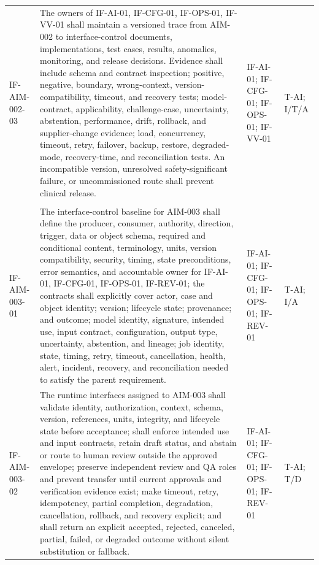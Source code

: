 \documentclass[11pt,letterpaper]{article}
\begin{document}
\begin{scriptsize}
\begin{longtable}{@{}L{0.14\textwidth}L{0.49\textwidth}L{0.19\textwidth}L{0.10\textwidth}@{}}
\addlinespace[2pt]
\mbox{IF-AIM-002-03} & The owners of IF-AI-01, IF-CFG-01, IF-OPS-01, IF-VV-01 shall maintain a versioned trace from AIM-002 to interface-control documents, implementations, test cases, results, anomalies, monitoring, and release decisions. Evidence shall include schema and contract inspection; positive, negative, boundary, wrong-context, version-compatibility, timeout, and recovery tests; model-contract, applicability, challenge-case, uncertainty, abstention, performance, drift, rollback, and supplier-change evidence; load, concurrency, timeout, retry, failover, backup, restore, degraded-mode, recovery-time, and reconciliation tests. An incompatible version, unresolved safety-significant failure, or uncommissioned route shall prevent clinical release. & IF-AI-01; IF-CFG-01; IF-OPS-01; IF-VV-01 & T-AI; I\slash\allowbreak{}T\slash\allowbreak{}A \\
\addlinespace[2pt]
 \\
\addlinespace[2pt]
\mbox{IF-AIM-003-01} & The interface-control baseline for AIM-003 shall define the producer, consumer, authority, direction, trigger, data or object schema, required and conditional content, terminology, units, version compatibility, security, timing, state preconditions, error semantics, and accountable owner for IF-AI-01, IF-CFG-01, IF-OPS-01, IF-REV-01; the contracts shall explicitly cover actor, case and object identity; version; lifecycle state; provenance; and outcome; model identity, signature, intended use, input contract, configuration, output type, uncertainty, abstention, and lineage; job identity, state, timing, retry, timeout, cancellation, health, alert, incident, recovery, and reconciliation needed to satisfy the parent requirement. & IF-AI-01; IF-CFG-01; IF-OPS-01; IF-REV-01 & T-AI; I\slash\allowbreak{}A \\
\addlinespace[2pt]
\mbox{IF-AIM-003-02} & The runtime interfaces assigned to AIM-003 shall validate identity, authorization, context, schema, version, references, units, integrity, and lifecycle state before acceptance; shall enforce intended use and input contracts, retain draft status, and abstain or route to human review outside the approved envelope; preserve independent review and QA roles and prevent transfer until current approvals and verification evidence exist; make timeout, retry, idempotency, partial completion, degradation, cancellation, rollback, and recovery explicit; and shall return an explicit accepted, rejected, canceled, partial, failed, or degraded outcome without silent substitution or fallback. & IF-AI-01; IF-CFG-01; IF-OPS-01; IF-REV-01 & T-AI; T\slash\allowbreak{}D \\

\end{longtable}
\end{scriptsize}
\end{document}
